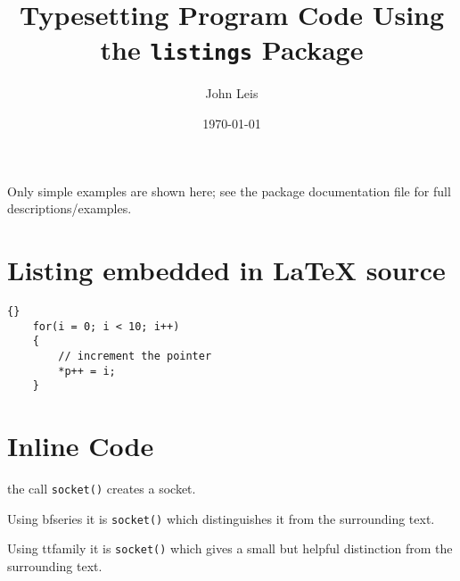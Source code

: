 \documentclass{article}
\begin{document}
\title{Typesetting Program Code Using the \texttt{listings} Package}
\author{John Leis}
\date{\today}
\maketitle

\lstlistoflistings


Only simple examples are shown here; see the package documentation file
for full descriptions/examples.

\section{Listing embedded in \LaTeX\/ source}

\lstset{language=c++}
\lstset{commentstyle=\textit}
\begin{lstlisting}[frame=trbl]{}
    for(i = 0; i < 10; i++)
    {
        // increment the pointer
        *p++ = i;
    }
\end{lstlisting}

\section{Inline Code}



\lstset{language=c}
the call \lstinline!socket()! creates a socket.

Using bfseries it is \lstinline[basicstyle=\bfseries]!socket()! which
distinguishes it from the surrounding text.

Using ttfamily it is  \lstinline[basicstyle=\ttfamily]!socket()! which
gives a small but helpful distinction from the surrounding text.
\end{document}
